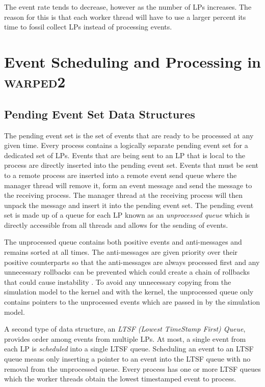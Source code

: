\documentclass[11pt]{book}
\begin{document}
The event rate tends to decrease, however as the number of LPs increases.  The reason for this is
that each worker thread will have to use a larger percent its time to fossil collect LPs instead of
processing events.



\chapter[Event Scheduling]{Event Scheduling and Processing in \textsc{warped2}}\label{warped2_ds}

\section{Pending Event Set Data Structures}

The pending event set is the set of events that are ready to be processed at any given time.  Every
process contains a logically separate pending event set for a dedicated set of LPs.  Events that are
being sent to an LP that is local to the process are directly inserted into the pending event set.
Events that must be sent to a remote process are inserted into a remote event send queue where the
manager thread will remove it, form an event message and send the message to the receiving process.
The manager thread at the receiving process will then unpack the message and insert it into the
pending event set.  The pending event set is made up of a queue for each LP known as an
\emph{unprocessed queue} which is directly accessible from all threads and allows for the sending of
events.

The unprocessed queue contains both positive events and anti-messages and remains sorted at all
times.  The anti-messages are given priority over their positive counterparts so that the
anti-messages are always processed first and any unnecessary rollbacks can be prevented which
could create a chain of rollbacks that could cause instability \cite{lubachevsky-89}.  To avoid
any unnecessary copying from the simulation model to the kernel and with the kernel, the
unprocessed queue only contains pointers to the unprocessed events which are passed in by the
simulation model.

A second type of data structure, an \emph{LTSF (Lowest TimeStamp First) Queue}, provides order among
events from multiple LPs.  At most, a single event from each LP is \emph{scheduled} into a single
LTSF queue.  Scheduling an event to an LTSF queue means only inserting a pointer to an event into
the LTSF queue with no removal from the unprocessed queue.  Every process has one or more LTSF
queues which the worker threads obtain the lowest timestamped event to process.
\end{document}
